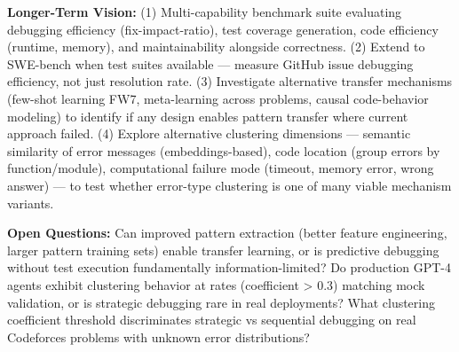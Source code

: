 \textbf{Longer-Term Vision:} (1) Multi-capability benchmark suite evaluating debugging efficiency (fix-impact-ratio), test coverage generation, code efficiency (runtime, memory), and maintainability alongside correctness. (2) Extend to SWE-bench when test suites available — measure GitHub issue debugging efficiency, not just resolution rate. (3) Investigate alternative transfer mechanisms (few-shot learning FW7, meta-learning across problems, causal code-behavior modeling) to identify if any design enables pattern transfer where current approach failed. (4) Explore alternative clustering dimensions — semantic similarity of error messages (embeddings-based), code location (group errors by function/module), computational failure mode (timeout, memory error, wrong answer) — to test whether error-type clustering is one of many viable mechanism variants.

\textbf{Open Questions:} Can improved pattern extraction (better feature engineering, larger pattern training sets) enable transfer learning, or is predictive debugging without test execution fundamentally information-limited? Do production GPT-4 agents exhibit clustering behavior at rates (coefficient > 0.3) matching mock validation, or is strategic debugging rare in real deployments? What clustering coefficient threshold discriminates strategic vs sequential debugging on real Codeforces problems with unknown error distributions?
